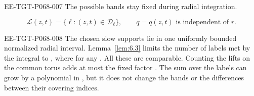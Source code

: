 \begin{EESegment}{EE-TGT-P068-007}
The possible bands stay fixed during radial integration.
\end{EESegment}
\[
  \mathcal L(z,t)=\{\ell:(z,t)\in \mathcal D_\ell\},
  \qquad q=q(z,t)\text{ is independent of }r.
\]
\begin{EESegment}{EE-TGT-P068-008}
The chosen slow supports lie in one uniformly bounded normalized radial interval. Lemma~\ref{lem:6.3} limits the number of labels met by the integral to , where  for any . All these  are comparable. Counting the lifts on the common torus adds at most the fixed factor . The sum over the labels can grow by a polynomial in , but it does not change the bands or the differences between their covering indices.
\end{EESegment}

